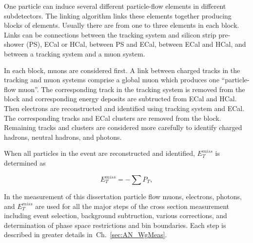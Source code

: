 One particle can induce several different particle-flow elements in different subdetectors. The linking algorithm links these elements together producing blocks of elements. Usually there are from one to three elements in each block. Links can be connections between the tracking system and silicon strip pre-shower (PS), ECal or HCal, between PS and ECal, between ECal and HCal, and between a tracking system and a muon system. 

In each block, muons are considered first. A link between charged tracks in the tracking and muon systems comprise a global muon which produces one ``particle-flow muon''. The corresponding track in the tracking system is removed from the block and corresponding energy deposits are subtructed from ECal and HCal. Then electrons are reconstructed and identified using tracking system and ECal. The corresponding tracks and ECal clusters are removed from the block. Remaining tracks and clusters are considered more carefully to identify charged hadrons, neutral hadrons, and photons.

When all particles in the event are reconstructed and identified, $E_T^{miss}$ is determined as

\begin{equation}\label{eq:MET}
  E_T^{miss} = - \sum P_T,
\end{equation}


In the measurement of this dissertation particle flow muons, electrons, photons, and $E_T^{miss}$ are used for all the major steps of the cross section measurement including event selection, background subtruction, various corrections, and determination of phase space restrictions and bin boundaries. Each step is described in greater details in~Ch.~\ref{sec:AN_WgMeas}. 

